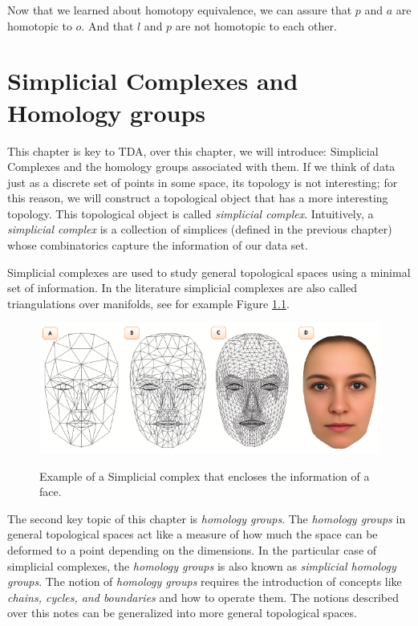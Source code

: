 \documentclass[
	fontsize=10pt, %
	twoside=false, %
	secnumdepth=1, %
]{kaobook}
\begin{document}
 Now that we learned about homotopy equivalence, we can assure that $p$ and $a$ are homotopic to $o.$ And that $l$ and $p$ are not homotopic to each other.
 
 
\chapter{Simplicial Complexes and Homology groups}

This chapter is key to TDA, over this chapter, we will introduce: Simplicial Complexes and the homology groups associated with them. If we think of data just as a discrete set of points in some space, its topology is not interesting; for this reason, we will construct a topological object that has a more interesting topology. This topological object is called \emph{simplicial complex}. Intuitively, a \emph{simplicial complex} is a collection of simplices (defined in the previous chapter) whose combinatorics capture the information of our data set.

Simplicial complexes are used to study general topological spaces using a minimal set of information. In the literature simplicial complexes are also called triangulations over manifolds, see for example Figure \ref{C2:Fig:Triang}. 

\begin{figure}[h]
\includegraphics[scale=0.5]{Face_Triang.png}
\label{C2:Fig:Triang}
\caption{Example of a Simplicial complex that encloses the information of a face.}
\end{figure}

The second key topic of this chapter is \emph{homology groups}. The \emph{homology groups} in general topological spaces act like a measure of how much the space can be deformed to a point depending on the dimensions. In the particular case of simplicial complexes, the \emph{homology groups} is also known as \emph{simplicial homology groups}. The notion of \emph{homology groups} requires the introduction of concepts like \emph{chains, cycles, and boundaries} and how to operate them. The notions described over this notes can be generalized into more general topological spaces.
\end{document}
